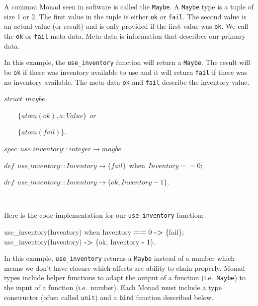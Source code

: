 \documentclass[
]{book}
\newenvironment{Shaded}{\begin{snugshade}}{\end{snugshade}}
\newcommand{\CharTok}[1]{\textcolor[rgb]{0.31,0.60,0.02}{#1}}
\newcommand{\DecValTok}[1]{\textcolor[rgb]{0.00,0.00,0.81}{#1}}
\newcommand{\FunctionTok}[1]{\textcolor[rgb]{0.00,0.00,0.00}{#1}}
\newcommand{\OperatorTok}[1]{\textcolor[rgb]{0.81,0.36,0.00}{\textbf{#1}}}
\newcommand{\VariableTok}[1]{\textcolor[rgb]{0.00,0.00,0.00}{#1}}
\begin{document}
A common Monad seen in software is called the \texttt{Maybe}. A \texttt{Maybe} type is a tuple of size 1 or 2. The first value in the tuple is either \texttt{ok} or \texttt{fail}. The second value is an actual value (or result) and is only provided if the first value was \texttt{ok}. We call the \texttt{ok} or \texttt{fail} meta-data. Meta-data is information that describes our primary data.

In this example, the \texttt{use\_inventory} function will return a \texttt{Maybe}. The result will be \texttt{ok} if there was inventory available to use and it will return \texttt{fail} if there was no inventory available. The meta-data \texttt{ok} and \texttt{fail} describe the inventory value.

\begin{formulabox}
\(struct ~ ~ maybe\)

\(\quad \quad \lbrace atom(ok), a:Value \rbrace ~ ~ or\)

\(\quad \quad \lbrace atom(fail) \rbrace.\)

\(spec ~ ~ use\_inventory :: integer \rightarrow maybe\)

\(de\mathit{f} ~ ~ use\_inventory :: Inventory \rightarrow \lbrace fail \rbrace ~ ~ \text{when} ~ ~ Inventory == 0;\)

\(de\mathit{f} ~ ~ use\_inventory :: Inventory \rightarrow \lbrace ok, Inventory - 1 \rbrace .\)

\end{formulabox}

\(\nonumber\)

Here is the code implementation for our \texttt{use\_inventory} function:

\begin{Shaded}
\begin{Highlighting}[]
\FunctionTok{use\_inventory(}\VariableTok{Inventory}\FunctionTok{)} \CharTok{when} \VariableTok{Inventory} \OperatorTok{==} \DecValTok{0} \OperatorTok{{-}\textgreater{}} \FunctionTok{\{}\CharTok{fail}\FunctionTok{\};}
\FunctionTok{use\_inventory(}\VariableTok{Inventory}\FunctionTok{)} \OperatorTok{{-}\textgreater{}} \FunctionTok{\{}\CharTok{ok}\FunctionTok{,} \VariableTok{Inventory} \OperatorTok{{-}} \DecValTok{1}\FunctionTok{\}.}
\end{Highlighting}
\end{Shaded}

In this example, \texttt{use\_inventory} returns a \texttt{Maybe} instead of a number which means we don't have closure which affects are ability to chain properly. Monad types include helper functions to adapt the output of a function (i.e.~\texttt{Maybe}) to the input of a function (i.e.~number). Each Monad must include a type constructor (often called \texttt{unit}) and a \texttt{bind} function described below.
\end{document}
